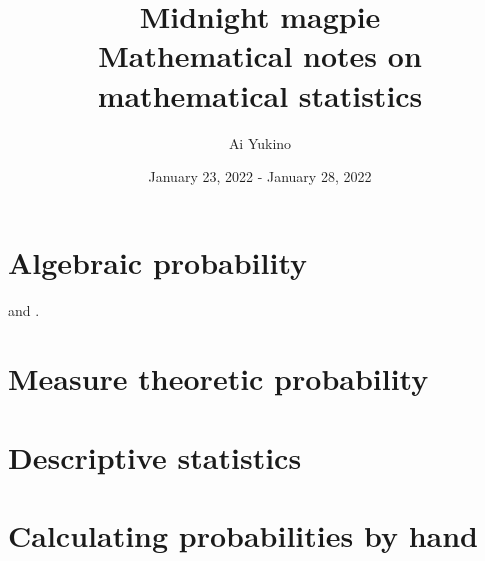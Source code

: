\documentclass{article}
\begin{document}
\title{Midnight magpie \\
	\large Mathematical notes on mathematical statistics}
\author{Ai Yukino}
\date{January 23, 2022 - January 28, 2022}
\maketitle
\hypersetup{linkcolor = internallinkcolor}
\tableofcontents
\hypersetup{linkcolor= .}

\section{Algebraic probability}

\cite{tao2015} and \cite{tao2009}.

\section{Measure theoretic probability}

\cite{tao2015}

\section{Descriptive statistics}

\section{Calculating probabilities by hand}





\end{document}
